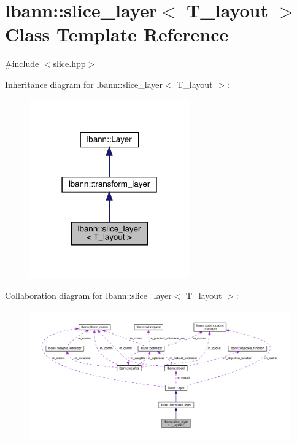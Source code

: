 \hypertarget{classlbann_1_1slice__layer}{}\section{lbann\+:\+:slice\+\_\+layer$<$ T\+\_\+layout $>$ Class Template Reference}
\label{classlbann_1_1slice__layer}


{\ttfamily \#include $<$slice.\+hpp$>$}



Inheritance diagram for lbann\+:\+:slice\+\_\+layer$<$ T\+\_\+layout $>$\+:\nopagebreak
\begin{figure}[H]
\begin{center}
\leavevmode
\includegraphics[width=195pt]{classlbann_1_1slice__layer__inherit__graph}
\end{center}
\end{figure}


Collaboration diagram for lbann\+:\+:slice\+\_\+layer$<$ T\+\_\+layout $>$\+:\nopagebreak
\begin{figure}[H]
\begin{center}
\leavevmode
\includegraphics[width=350pt]{classlbann_1_1slice__layer__coll__graph}
\end{center}
\end{figure}
